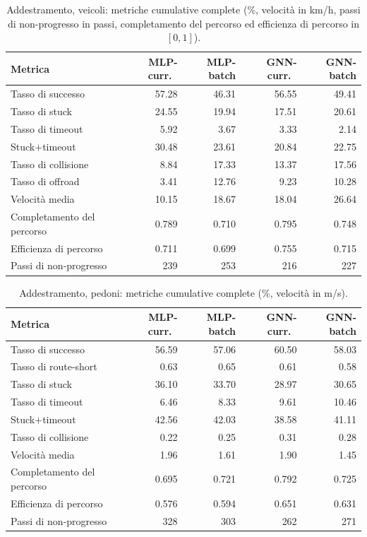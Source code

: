 \begin{table}[h]
  \centering\small
  \caption{Addestramento, veicoli: metriche cumulative complete (\%,
  velocità in km/h, passi di non-progresso in passi, completamento del
  percorso ed efficienza di percorso in $[0,1]$).}
  \begin{tabular}{@{}lrrrr@{}}
    \toprule
    Metrica & MLP-curr.\ & MLP-batch & GNN-curr.\ & GNN-batch \\
    \midrule
    Tasso di successo & 57.28 & 46.31 & 56.55 & 49.41 \\
    Tasso di stuck & 24.55 & 19.94 & 17.51 & 20.61 \\
    Tasso di timeout & 5.92 & 3.67 & 3.33 & 2.14 \\
    Stuck$+$timeout & 30.48 & 23.61 & 20.84 & 22.75 \\
    Tasso di collisione & 8.84 & 17.33 & 13.37 & 17.56 \\
    Tasso di offroad & 3.41 & 12.76 & 9.23 & 10.28 \\
    Velocità media & 10.15 & 18.67 & 18.04 & 26.64 \\
    Completamento del percorso & 0.789 & 0.710 & 0.795 & 0.748 \\
    Efficienza di percorso & 0.711 & 0.699 & 0.755 & 0.715 \\
    Passi di non-progresso & 239 & 253 & 216 & 227 \\
    \bottomrule
  \end{tabular}
\end{table}

\begin{table}[h]
  \centering\small
  \caption{Addestramento, pedoni: metriche cumulative complete (\%,
  velocità in m/s).}
  \begin{tabular}{@{}lrrrr@{}}
    \toprule
    Metrica & MLP-curr.\ & MLP-batch & GNN-curr.\ & GNN-batch \\
    \midrule
    Tasso di successo & 56.59 & 57.06 & 60.50 & 58.03 \\
    Tasso di route-short & 0.63 & 0.65 & 0.61 & 0.58 \\
    Tasso di stuck & 36.10 & 33.70 & 28.97 & 30.65 \\
    Tasso di timeout & 6.46 & 8.33 & 9.61 & 10.46 \\
    Stuck$+$timeout & 42.56 & 42.03 & 38.58 & 41.11 \\
    Tasso di collisione & 0.22 & 0.25 & 0.31 & 0.28 \\
    Velocità media & 1.96 & 1.61 & 1.90 & 1.45 \\
    Completamento del percorso & 0.695 & 0.721 & 0.792 & 0.725 \\
    Efficienza di percorso & 0.576 & 0.594 & 0.651 & 0.631 \\
    Passi di non-progresso & 328 & 303 & 262 & 271 \\
    \bottomrule
  \end{tabular}
\end{table}

